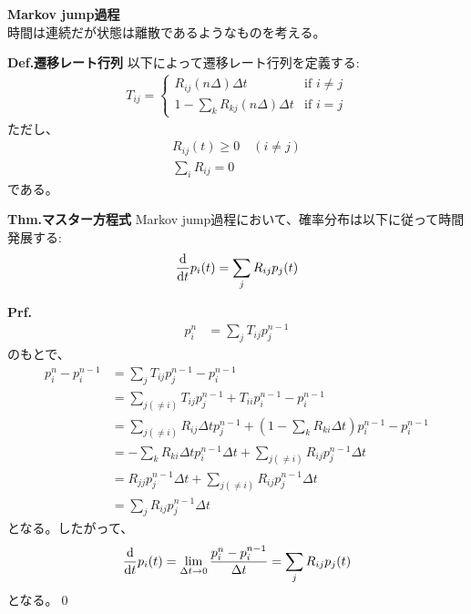 \documentclass[a4paper,11pt]{jsarticle}
\numberwithin{equation}{section}
\begin{document}
\textbf{Markov jump過程}\\
時間は連続だが状態は離散であるようなものを考える。\\
\begin{itembox}[l]{\textbf{Def.遷移レート行列}}
  以下によって遷移レート行列を定義する:
  \begin{align}
    T_{ij} = \begin{cases}
      R_{ij}(n\Delta) \Delta t & \text{if $i \neq j$}\\
      1-\sum_{k}R_{kj}(n\Delta) \Delta t & \text{if $i = j$}
    \end{cases}
  \end{align}
  ただし、
  \begin{align}
    R_{ij}(t) \geq 0 \quad (i \neq j)\\
    \sum_{i}R_{ij} = 0
  \end{align}
  である。
\end{itembox}

\begin{itembox}[l]{\textbf{Thm.マスター方程式}}
  Markov jump過程において、確率分布は以下に従って時間発展する:
  \begin{align}
    \dv{t}p_i(t) = \sum_{j}R_{ij}p_j(t) 
  \end{align}
\end{itembox}
\textbf{Prf.}\\
\begin{align}
  p_i^{n} &= \sum_{j}T_{ij}p_j^{n-1}
\end{align}
のもとで、
\begin{align}
  p_i^n - p_i^{n-1} &= \sum_{j}T_{ij}p_j^{n-1} - p_i^{n-1}\\
  &= \sum_{j(\neq i)}T_{ij}p_j^{n-1} + T_{ii}p_i^{n-1} - p_i^{n-1}\\
  &= \sum_{j(\neq i)}R_{ij}\Delta t p_j^{n-1} + (1-\sum_{k}R_{ki}\Delta t)p_i^{n-1} - p_i^{n-1}\\
  &= -\sum_{k}R_{ki}\Delta t p_i^{n-1} \Delta t + \sum_{j(\neq i)}R_{ij}p_j^{n-1}\Delta t\\
  &= R_{jj}p_j^{n-1}\Delta t + \sum_{j(\neq i)}R_{ij}p_j^{n-1}\Delta t\\
  &= \sum_{j}R_{ij}p_j^{n-1}\Delta t
\end{align}
となる。したがって、
\begin{align}
  \dv{t}p_i(t) = \lim_{\Delta t \to 0}\frac{p_i^n - p_i^{n-1}}{\Delta t} = \sum_{j}R_{ij}p_j(t)
\end{align}
となる。\qed\\
\end{document}
